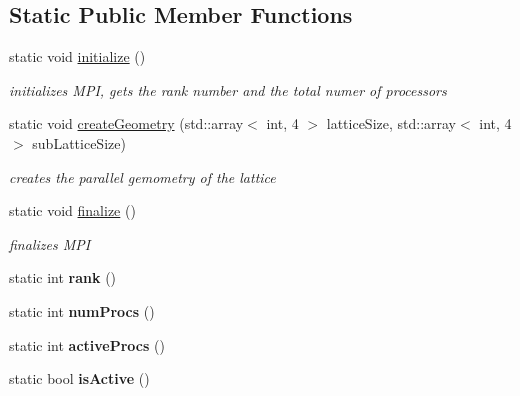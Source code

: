 \subsection*{Static Public Member Functions}
\begin{DoxyCompactItemize}
\item 
static void \hyperlink{classParallel_a7cf27d593972dee2d3f6e5319fcf450e}{initialize} ()\hypertarget{classParallel_a7cf27d593972dee2d3f6e5319fcf450e}{}\label{classParallel_a7cf27d593972dee2d3f6e5319fcf450e}

\begin{DoxyCompactList}\small\item\em initializes M\+PI, gets the rank number and the total numer of processors \end{DoxyCompactList}\item 
static void \hyperlink{classParallel_a8888fe404de3a3f479fff0796916f851}{create\+Geometry} (std\+::array$<$ int, 4 $>$ lattice\+Size, std\+::array$<$ int, 4 $>$ sub\+Lattice\+Size)
\begin{DoxyCompactList}\small\item\em creates the parallel gemometry of the lattice \end{DoxyCompactList}\item 
static void \hyperlink{classParallel_ac81d8fad81830939d9338b2e46d71b60}{finalize} ()\hypertarget{classParallel_ac81d8fad81830939d9338b2e46d71b60}{}\label{classParallel_ac81d8fad81830939d9338b2e46d71b60}

\begin{DoxyCompactList}\small\item\em finalizes M\+PI \end{DoxyCompactList}\item 
static int {\bfseries rank} ()\hypertarget{classParallel_ad8a436ba61d28a6f7569eec3ac4a929e}{}\label{classParallel_ad8a436ba61d28a6f7569eec3ac4a929e}

\item 
static int {\bfseries num\+Procs} ()\hypertarget{classParallel_a6af0b709a019dd91b0d3bbd4a2b74e54}{}\label{classParallel_a6af0b709a019dd91b0d3bbd4a2b74e54}

\item 
static int {\bfseries active\+Procs} ()\hypertarget{classParallel_a9569b920d302407a51a43c125a878b43}{}\label{classParallel_a9569b920d302407a51a43c125a878b43}

\item 
static bool {\bfseries is\+Active} ()\hypertarget{classParallel_a1402031c4027212fa9cd53cbe86b5b41}{}\label{classParallel_a1402031c4027212fa9cd53cbe86b5b41}


\end{DoxyCompactItemize}
